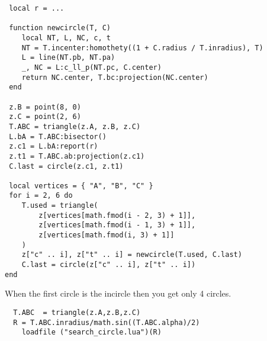\begin{mybox}
\begin{verbatim}
 local r = ...

 function newcircle(T, C)
 	local NT, L, NC, c, t
 	NT = T.incenter:homothety((1 + C.radius / T.inradius), T)
 	L = line(NT.pb, NT.pa)
 	_, NC = L:c_ll_p(NT.pc, C.center)
 	return NC.center, T.bc:projection(NC.center)
 end

 z.B = point(8, 0)
 z.C = point(2, 6)
 T.ABC = triangle(z.A, z.B, z.C)
 L.bA = T.ABC:bisector()
 z.c1 = L.bA:report(r)
 z.t1 = T.ABC.ab:projection(z.c1)
 C.last = circle(z.c1, z.t1)

 local vertices = { "A", "B", "C" }
 for i = 2, 6 do
	T.used = triangle(
		z[vertices[math.fmod(i - 2, 3) + 1]],
		z[vertices[math.fmod(i - 1, 3) + 1]],
		z[vertices[math.fmod(i, 3) + 1]]
	)
	z["c" .. i], z["t" .. i] = newcircle(T.used, C.last)
	C.last = circle(z["c" .. i], z["t" .. i])
end
\end{verbatim}
\end{mybox}


\vspace{1em}



\begin{tkzexample}[vbox]
\end{tkzexample}



\vspace{12pt}
When the first circle is the incircle then you get only 4 circles.


\begin{mybox}
  \begin{verbatim}
  T.ABC  = triangle(z.A,z.B,z.C)
  R = T.ABC.inradius/math.sin((T.ABC.alpha)/2)
    loadfile ("search_circle.lua")(R)
  \end{verbatim}
\end{mybox}


\begin{tkzexample}[vbox]

\end{tkzexample}




